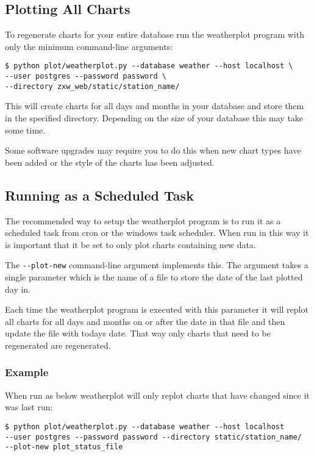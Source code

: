 \documentclass[a4paper,10pt,draft]{book}
\begin{document}
\subsection{Plotting All Charts}

To regenerate charts for your entire database run the weatherplot program with only the minimum command-line arguments:

\begin{verbatim}
$ python plot/weatherplot.py --database weather --host localhost \
--user postgres --password password \
--directory zxw_web/static/station_name/
\end{verbatim}

This will create charts for all days and months in your database and store them in the specified directory. Depending on the size of your database this may take some time.

Some software upgrades may require you to do this when new chart types have been added or the style of the charts has been adjusted.

\subsection{Running as a Scheduled Task}

The recommended way to setup the weatherplot program is to run it as a scheduled task from cron or the windows task scheduler. When run in this way it is important that it be set to only plot charts containing new data.

The \verb|--plot-new| command-line argument implements this. The argument takes a single parameter which is the name of a file to store the date of the last plotted day in.

Each time the weatherplot program is executed with this parameter it will replot all charts for all days and months on or after the date in that file and then update the file with todays date. That way only charts that need to be regenerated are regenerated.

\subsubsection{Example}

When run as below weatherplot will only replot charts that have changed since it was last run:
\begin{verbatim}
$ python plot/weatherplot.py --database weather --host localhost
--user postgres --password password --directory static/station_name/
--plot-new plot_status_file
\end{verbatim}
\end{document}
